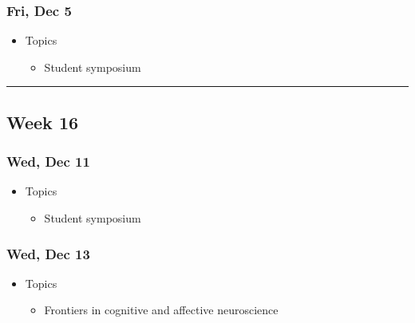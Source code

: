 \documentclass[]{article}
\providecommand{\tightlist}{%
  \setlength{\itemsep}{0pt}\setlength{\parskip}{0pt}}
\begin{document}
\hypertarget{fri-dec-5}{%
\subsubsection{Fri, Dec 5}\label{fri-dec-5}}

\begin{itemize}
\tightlist
\item
  Topics

  \begin{itemize}
  \tightlist
  \item
    Student symposium
  \end{itemize}
\end{itemize}

\begin{center}\rule{0.5\linewidth}{\linethickness}\end{center}

\hypertarget{week-16}{%
\subsection{Week 16}\label{week-16}}

\hypertarget{wed-dec-11}{%
\subsubsection{Wed, Dec 11}\label{wed-dec-11}}

\begin{itemize}
\tightlist
\item
  Topics

  \begin{itemize}
  \tightlist
  \item
    Student symposium
  \end{itemize}
\end{itemize}

\hypertarget{wed-dec-13}{%
\subsubsection{Wed, Dec 13}\label{wed-dec-13}}

\begin{itemize}
\tightlist
\item
  Topics

  \begin{itemize}
  \tightlist
  \item
    Frontiers in cognitive and affective neuroscience
  \end{itemize}
\end{itemize}
\end{document}
